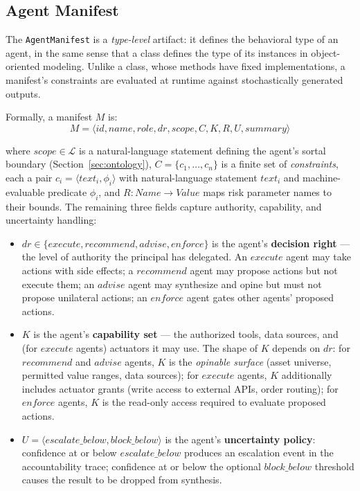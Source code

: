 \documentclass[runningheads]{llncs}
\begin{document}
\subsection{Agent Manifest}
\label{sec:manifest}

The \texttt{AgentManifest} is a \emph{type-level} artifact: it defines
the behavioral type of an agent, in the same sense that a class defines
the type of its instances in object-oriented modeling. Unlike a class,
whose methods have fixed implementations, a manifest's constraints are
evaluated at runtime against stochastically generated outputs.

Formally, a manifest $M$ is:
\begin{equation}
M = \langle \mathit{id}, \mathit{name}, \mathit{role}, \mathit{dr},
    \mathit{scope}, C, K, R, U, \mathit{summary} \rangle
\end{equation}

\noindent where $\mathit{scope} \in \mathcal{L}$ is a natural-language
statement defining the agent's sortal boundary (Section~\ref{sec:ontology}),
$C = \{c_1, \ldots, c_n\}$ is a finite set of \emph{constraints}, each
a pair $c_i = \langle \mathit{text}_i, \phi_i \rangle$ with natural-language
statement $\mathit{text}_i$ and machine-evaluable predicate $\phi_i$, and
$R: \mathit{Name} \rightarrow \mathit{Value}$ maps risk parameter names
to their bounds. The remaining three fields capture authority,
capability, and uncertainty handling:

\begin{itemize}
    \item $\mathit{dr} \in \{\mathit{execute}, \mathit{recommend},
    \mathit{advise}, \mathit{enforce}\}$ is the agent's
    \textbf{decision right} --- the level of authority the principal
    has delegated. An $\mathit{execute}$ agent may take actions with
    side effects; a $\mathit{recommend}$ agent may propose actions
    but not execute them; an $\mathit{advise}$ agent may synthesize
    and opine but must not propose unilateral actions; an
    $\mathit{enforce}$ agent gates other agents' proposed actions.
    \item $K$ is the agent's \textbf{capability set} --- the
    authorized tools, data sources, and (for $\mathit{execute}$
    agents) actuators it may use. The shape of $K$ depends on
    $\mathit{dr}$: for $\mathit{recommend}$ and $\mathit{advise}$
    agents, $K$ is the \emph{opinable surface} (asset universe,
    permitted value ranges, data sources); for $\mathit{execute}$
    agents, $K$ additionally includes actuator grants (write access
    to external APIs, order routing); for $\mathit{enforce}$ agents,
    $K$ is the read-only access required to evaluate proposed
    actions.
    \item $U = \langle \mathit{escalate\_below},
    \mathit{block\_below} \rangle$ is the agent's
    \textbf{uncertainty policy}: confidence at or below
    $\mathit{escalate\_below}$ produces an escalation event in the
    accountability trace; confidence at or below the optional
    $\mathit{block\_below}$ threshold causes the result to be
    dropped from synthesis.
\end{itemize}
\end{document}
